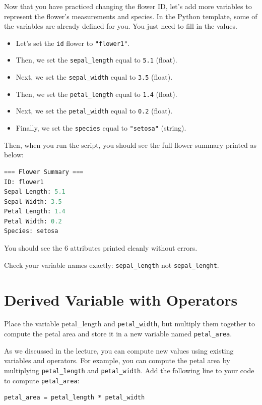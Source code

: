 Now that you have practiced changing the flower ID, let's add more variables to represent the flower's measurements and species. In the Python template, some of the variables are already defined for you. You just need to fill in the values.
\begin{itemize}
    \item Let's set the \texttt{id} flower to \texttt{"flower1"}.
    \item Then, we set the \texttt{sepal\_length} equal to \texttt{5.1} (float).
    \item Next, we set the \texttt{sepal\_width} equal to \texttt{3.5} (float).
    \item Then, we set the \texttt{petal\_length} equal to \texttt{1.4} (float).
    \item Next, we set the \texttt{petal\_width} equal to \texttt{0.2} (float).
    \item Finally, we set the \texttt{species} equal to \texttt{"setosa"} (string).
\end{itemize}

Then, when you run the script, you should see the full flower summary printed as below:
\begin{lstlisting}[language=Python]
=== Flower Summary ===
ID: flower1
Sepal Length: 5.1
Sepal Width: 3.5
Petal Length: 1.4
Petal Width: 0.2
Species: setosa
\end{lstlisting}

\begin{tcolorbox}[title=Checkpoint]
You should see the 6 attributes printed cleanly without errors.
\end{tcolorbox}
\begin{tcolorbox}[title=Common Mistakes]
Check your variable names exactly: \texttt{sepal\_length} not \texttt{sepal\_lenght}.
\end{tcolorbox}

\section{Derived Variable with Operators}

\begin{tcolorbox}[title=Task 4: Compute petal area]
Place the variable {petal\_length} and \texttt{petal\_width}, but multiply them together to compute the petal area and store it in a new variable named \texttt{petal\_area}. 
\end{tcolorbox}


As we discussed in the lecture, you can compute new values using existing variables and operators.
For example, you can compute the petal area by multiplying \texttt{petal\_length} and \texttt{petal\_width}.
Add the following line to your code to compute \texttt{petal\_area}:
\begin{verbatim}
petal_area = petal_length * petal_width
\end{verbatim}

